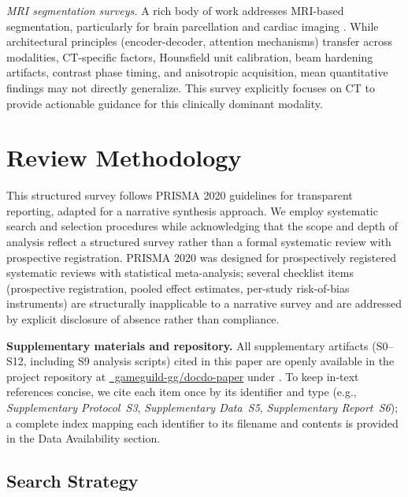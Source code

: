 \emph{MRI segmentation surveys.} A rich body of work addresses MRI-based segmentation, particularly for brain parcellation \cite{fischl2012freesurfer} and cardiac imaging \cite{chen2020cardiac}. While architectural principles (encoder-decoder, attention mechanisms) transfer across modalities, CT-specific factors, Hounsfield unit calibration, beam hardening artifacts, contrast phase timing, and anisotropic acquisition, mean quantitative findings may not directly generalize. This survey explicitly focuses on CT to provide actionable guidance for this clinically dominant modality.

\section{Review Methodology}
\label{sec:methodology}

This structured survey follows PRISMA 2020 guidelines \cite{page2021prisma} for transparent reporting, adapted for a narrative synthesis approach. We employ systematic search and selection procedures while acknowledging that the scope and depth of analysis reflect a structured survey rather than a formal systematic review with prospective registration. PRISMA 2020 was designed for prospectively registered systematic reviews with statistical meta-analysis; several checklist items (prospective registration, pooled effect estimates, per-study risk-of-bias instruments) are structurally inapplicable to a narrative survey and are addressed by explicit disclosure of absence rather than compliance.

\textbf{Supplementary materials and repository.} All supplementary artifacts (S0--S12, including S9 analysis scripts) cited in this paper are openly available in the project repository at \href{https://github.com/gameguild-gg/docdo-paper}{\faGithub\ gameguild-gg/docdo-paper} under . To keep in-text references concise, we cite each item once by its identifier and type (e.g., \emph{Supplementary Protocol~S3}, \emph{Supplementary Data~S5}, \emph{Supplementary Report~S6}); a complete index mapping each identifier to its filename and contents is provided in the Data Availability section.

\subsection{Search Strategy}

